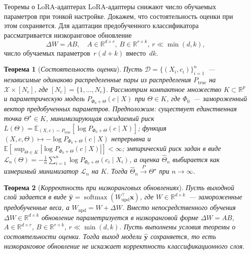 \documentclass[10pt,pdf,hyperref={unicode}]{beamer}
\newtheorem{rustheorem}{Теорема}
\begin{document}
\begin{frame}{Теоремы о LoRA-адаптерах}
\justifying
\footnotesize
LoRA-адаптеры снижают число обучаемых параметров при тонкой настройке. Докажем, что состоятельность оценки при этом сохраняется. Для адаптации предобученного классификатора рассматривается низкоранговое обновление
\[
    \Delta W = AB,\quad A\in\mathbb{R}^{d\times r},\ B\in\mathbb{R}^{r\times k},\ r\ll\min(d,k),
\]
число обучаемых параметров~$r(d+k)$ вместо~$dk$.

\begin{rustheorem}[\emph{Состоятельность оценки}]
    \justifying
    Пусть $\mathcal{D}=\{(X_i,c_i)\}_{i=1}^n$~--- независимые одинаково распределенные пары из распределения $P_{\mathrm{true}}$ на $\mathcal{X}\times[N_c]$, где $[N_c]=\{1,\ldots,N_c\}$. Рассмотрим компактное множество $K\subset\mathbb{R}^p$ и параметрическую модель $P_{\Phi_0+\Theta}(c\mid X)$ при $\Theta\in K$, где $\Phi_0$~--- замороженный вектор предобученных параметров. Предположим: существует единственная точка $\Theta^\star\in K$, минимизирующая ожидаемый риск $L(\Theta)=\mathbb{E}_{(X,c)\sim P_{\mathrm{true}}}[\log P_{\Phi_0+\Theta}(c\mid X)]$; функция $(X,c,\Theta)\mapsto-\log P_{\Phi_0+\Theta}(c\mid X)$ непрерывна и $\mathbb{E}[\sup_{\Theta\in K}|\log P_{\Phi_0+\Theta}(c\mid X)|]<\infty$; эмпирический риск задан в виде $\mathcal{L}_n(\Theta)=-\frac{1}{n}\sum_{i=1}^n\log P_{\Phi_0+\Theta}(c_i\mid X_i)$, а оценка $\widehat{\Theta}_n$ выбирается как измеримый минимизатор $\mathcal{L}_n$ на $K$. Тогда $\widehat{\Theta}_n\xrightarrow{P}\Theta^\star$ при $n\to\infty$.
\end{rustheorem}

\begin{rustheorem}[\emph{Корректность при низкоранговых обновлениях}]
    \justifying
    Пусть выходной слой задается в виде $\hat{\mathbf{y}}=\operatorname{softmax}(W_{\mathrm{upd}}^{\top}\mathbf{x})$, где $W\in\mathbb{R}^{d\times k}$~--- замороженные предобученные веса, а $W_{\mathrm{upd}}=W+\Delta W$. Вместо непосредственного обучения $\Delta W\in\mathbb{R}^{d\times k}$ обновление параметризуется в низкоранговой форме $\Delta W=AB$, $A\in\mathbb{R}^{d\times r}$, $B\in\mathbb{R}^{r\times k}$, $r\ll\min(d,k)$. Пусть выполнены условия теоремы о состоятельности оценки. Тогда выход модели $\hat{\mathbf{y}}$ сохраняется, то есть низкоранговое обновление не искажает корректность классификационного слоя.
\end{rustheorem}
\end{frame}
\end{document}
